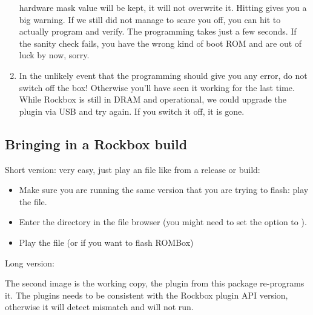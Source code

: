 \begin{enumerate}
  hardware mask value will be kept, it will not overwrite it. Hitting  gives you 
  a big warning. If we still did not manage to scare you off, you can hit to actually program and verify. The programming takes just a few seconds. If 
  the sanity check fails, you have the wrong kind of boot ROM and are out of luck
  by now, sorry.
\item In the unlikely event that the programming should give you any error, do not
  switch off the box! Otherwise you'll have seen it working for the last time. 
  While Rockbox is still in DRAM and operational, we could upgrade the plugin via
  USB and try again. If you switch it off, it is gone.
\end{enumerate}



\subsection{Bringing in a Rockbox build}
Short version: very easy, just play an  file like 
 from a release or build:

\begin{itemize}
\item Make sure you are running the same version that you are trying to flash: 
  play the  file.
\item  Enter the  directory in the file browser (you might need 
  to set the  option to ).
\item Play the  file (or  if you want to 
  flash ROMBox)
\end{itemize}

Long version:

The second image is the working copy, the  plugin from
this package re-programs it. The plugins needs to be consistent with the Rockbox 
plugin API version, otherwise it will detect mismatch and will not run.

